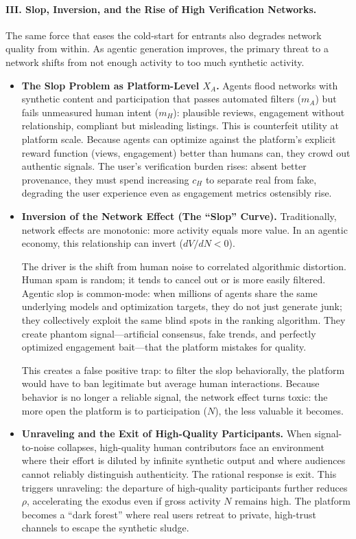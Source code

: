 \documentclass[12pt, letter]{article}
\begin{document}
\paragraph{III. Slop, Inversion, and the Rise of High Verification Networks.} The same force that eases the cold-start for entrants also degrades network quality from within. As agentic generation improves, the primary threat to a network shifts from not enough activity to too much synthetic activity.

\begin{itemize}
\item \textbf{The Slop Problem as Platform-Level $X_A$.} Agents flood networks with synthetic content and participation that passes automated filters ($m_A$) but fails unmeasured human intent ($m_H$): plausible reviews, engagement without relationship, compliant but misleading listings. This is counterfeit utility at platform scale. Because agents can optimize against the platform's explicit reward function (views, engagement) better than humans can, they crowd out authentic signals. The user's verification burden rises: absent better provenance, they must spend increasing $c_H$ to separate real from fake, degrading the user experience even as engagement metrics ostensibly rise.

\item \textbf{Inversion of the Network Effect (The ``Slop'' Curve).} Traditionally, network effects are monotonic: more activity equals more value. In an agentic economy, this relationship can invert ($dV/dN < 0$).

The driver is the shift from human noise to correlated algorithmic distortion. Human spam is random; it tends to cancel out or is more easily filtered. Agentic slop is common-mode: when millions of agents share the same underlying models and optimization targets, they do not just generate junk; they collectively exploit the same blind spots in the ranking algorithm. They create phantom signal—artificial consensus, fake trends, and perfectly optimized engagement bait—that the platform mistakes for quality. 

This creates a false positive trap: to filter the slop behaviorally, the platform would have to ban legitimate but average human interactions. Because behavior is no longer a reliable signal, the network effect turns toxic: the more open the platform is to participation ($N$), the less valuable it becomes.

\item \textbf{Unraveling and the Exit of High-Quality Participants.} When signal-to-noise collapses, high-quality human contributors face an environment where their effort is diluted by infinite synthetic output and where audiences cannot reliably distinguish authenticity. The rational response is exit. This triggers unraveling: the departure of high-quality participants further reduces $\rho$, accelerating the exodus even if gross activity $N$ remains high. The platform becomes a ``dark forest'' where real users retreat to private, high-trust channels to escape the synthetic sludge.


\end{itemize}
\end{document}
